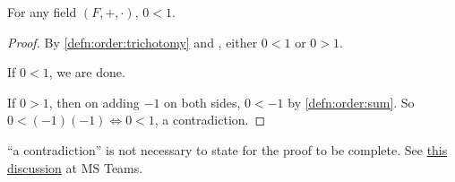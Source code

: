 \begin{thm} \label{thm:field:0<1}
    For any field $(F, +, \cdot)$, $0 < 1$.
\end{thm}
\begin{proof}
    By \cref{defn:order:trichotomy} and , either $0 < 1$ or $0 > 1$.

    If $0 < 1$, we are done.

    If $0 > 1$, then on adding $-1$ on both sides, $0 < -1$ by \cref{defn:order:sum}.
    So $0 < (-1)(-1) \iff 0 < 1$, a contradiction.
\end{proof}
\begin{rem}
    ``a contradiction'' is not necessary to state for the proof to be complete. See \href{https://teams.microsoft.com/l/message/19:5PNDOetYK3gbPZWX5Muk\_KnaEXgulRmRNwNmAHA8dZ81@thread.tacv2/1666960265828?tenantId=6f15cd97-f6a7-41e3-b2c5-ad4193976476&groupId=9cf683b7-9233-4d97-a7eb-1dc0051039a7&parentMessageId=1666960265828&teamName=UM\%20101\%20October\%202022&channelName=General&createdTime=1666960265828&allowXTenantAccess=false}{this discussion} at MS Teams.
\end{rem}
